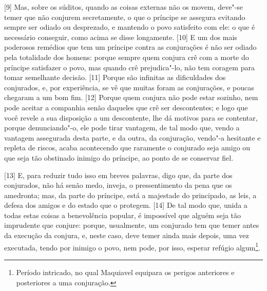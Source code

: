 {[}9{]} Mas, sobre os súditos, quando as coisas externas não os movem,
deve"-se temer que não conjurem secretamente, o que o príncipe se
assegura evitando sempre ser odiado ou desprezado, e mantendo o povo
satisfeito com ele: o que é necessário conseguir, como acima se disse
longamente. {[}10{]} E um dos mais poderosos remédios que tem um
príncipe contra as conjurações é não ser odiado pela totalidade dos
homens: porque sempre quem conjura crê com a morte do príncipe
satisfazer o povo, mas quando crê prejudica"-lo, não tem coragem para
tomar semelhante decisão. {[}11{]} Porque são infinitas as dificuldades
dos conjurados, e, por experiência, se vê que muitas foram as
conjurações, e poucas chegaram a um bom fim. {[}12{]} Porque quem
conjura não pode estar sozinho, nem pode aceitar a companhia senão
daqueles que crê ser descontentes; e logo que você revele a sua
disposição a um descontente, lhe dá motivos para se contentar, porque
denunciando"-o, ele pode tirar vantagem, de tal modo que, vendo a
vantagem assegurada desta parte, e da outra, da conjuração, vendo"-a
hesitante e repleta de riscos, acaba acontecendo que raramente o
conjurado seja amigo ou que seja tão obstinado inimigo do príncipe, ao
ponto de se conservar fiel.

{[}13{]} E, para reduzir tudo isso em breves
palavras, digo que, da parte dos conjurados, não há senão medo, inveja,
o pressentimento da pena que os amedronta; mas, da parte do príncipe,
está a majestade do principado, as leis, a defesa dos amigos e do estado
que o protegem. {[}14{]} De tal modo que, unida a todas estas coisas a
benevolência popular, é impossível que alguém seja tão imprudente que
conjure: porque, usualmente, um conjurado tem que temer antes da
execução da conjura, e, neste caso, deve temer ainda mais depois, uma
vez executada, tendo por inimigo o povo, nem pode, por isso, esperar
refúgio algum\footnote{Período intricado, no qual Maquiavel equipara os
  perigos anteriores e posteriores a uma conjuração.}.

